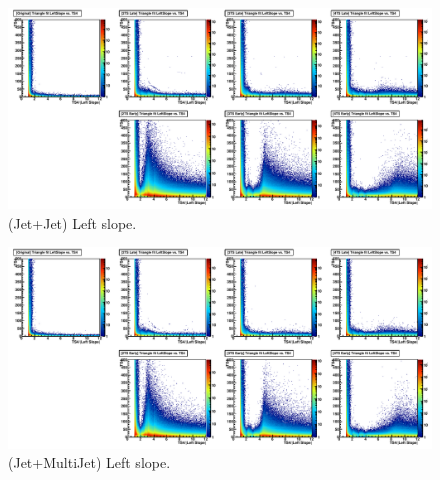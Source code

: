 \begin{figure}
   \includegraphics[width=120mm]{DailyLog/6411/6411_MixJetOnJetLeftSlope.pdf}
   \caption{(Jet+Jet) Left slope.}
   \label{Figure_6411_MixJetOnJetLeftSlope}
\end{figure}
\begin{figure}
   \includegraphics[width=120mm]{DailyLog/6411/6411_MixJetOnMultiJetLeftSlope.pdf}
   \caption{(Jet+MultiJet) Left slope.}
   \label{Figure_6411_MixJetOnMultiJetLeftSlope}
\end{figure}

